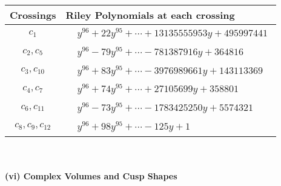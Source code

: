 \documentclass[1p]{elsarticle_modified}
\theoremstyle{definition}
\begin{document}
\begin{tabular}{m{50pt}|m{274pt}}
Crossings & \hspace{64pt}Riley Polynomials at each crossing \\
\hline $$\begin{aligned}c_{1}\end{aligned}$$&$\begin{aligned}
&y^{96}+22 y^{95}+\cdots+13135555953 y+495997441
\end{aligned}$\\
\hline $$\begin{aligned}c_{2},c_{5}\end{aligned}$$&$\begin{aligned}
&y^{96}-79 y^{95}+\cdots-781387916 y+364816
\end{aligned}$\\
\hline $$\begin{aligned}c_{3},c_{10}\end{aligned}$$&$\begin{aligned}
&y^{96}+83 y^{95}+\cdots-3976989661 y+143113369
\end{aligned}$\\
\hline $$\begin{aligned}c_{4},c_{7}\end{aligned}$$&$\begin{aligned}
&y^{96}+74 y^{95}+\cdots+27105699 y+358801
\end{aligned}$\\
\hline $$\begin{aligned}c_{6},c_{11}\end{aligned}$$&$\begin{aligned}
&y^{96}-73 y^{95}+\cdots-1783425250 y+5574321
\end{aligned}$\\
\hline $$\begin{aligned}c_{8},c_{9},c_{12}\end{aligned}$$&$\begin{aligned}
&y^{96}+98 y^{95}+\cdots-125 y+1
\end{aligned}$\\
\hline
\end{tabular}\\~\\
\newpage\flushleft \textbf{(vi) Complex Volumes and Cusp Shapes}
\end{document}
